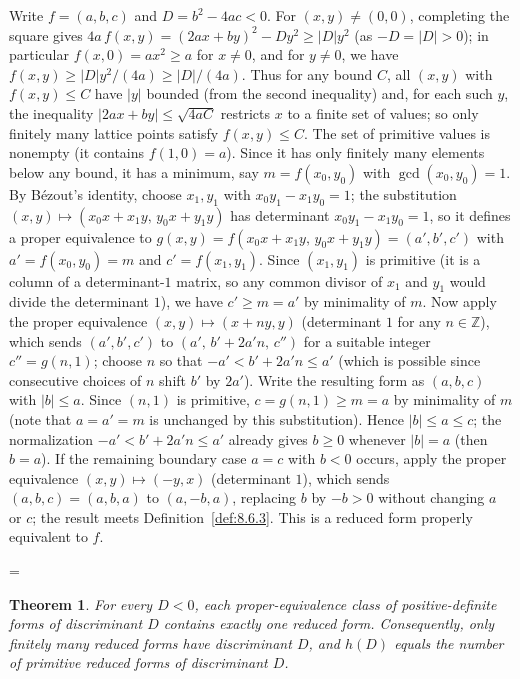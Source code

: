 \documentclass[11pt]{article}
\makeatletter
\theoremstyle{ntstyle}
\newtheorem{theorem}{Theorem}[subsection]
\let\nt@closedisplay\]
\def\nt@guardedclose{\@ifnextchar\par{\nt@closeafterpar}{\@ifnextchar\end{\postdisplaypenalty\@M\nt@closedisplay}{\nt@closedisplay}}}
\def\nt@closeafterpar\par{\@ifnextchar\par{\nt@closeafterpar}{\@ifnextchar\end{\postdisplaypenalty\@M\nt@closedisplay\par}{\nt@closedisplay\par}}}
\renewenvironment{proof}[1][\proofname]{\par
  \pushQED{\qed}\normalfont\topsep\medskipamount\edef\nt@afterproof{\@endparpenalty=\the\@endparpenalty\relax}\@beginparpenalty\@M\@endparpenalty\@M\let\]\nt@guardedclose\trivlist\item[]\textit{#1\@addpunct{.}} \ignorespaces}{\ifvmode\addpenalty\@M\fi\popQED\nt@afterproof\endtrivlist\@endpefalse}
\makeatother
\begin{document}
\begin{proof} Write $f=(a,b,c)$ and $D=b^2-4ac<0$. For
	$(x,y)\neq(0,0)$, completing the square gives
	$4a\,f(x,y)=(2ax+by)^2-Dy^2\ge|D|y^2$ (as $-D=|D|>0$); in particular
	$f(x,0)=ax^2\ge a$ for $x\neq0$, and for $y\neq0$,
	we have $f(x,y)\ge|D|y^2/(4a)\ge|D|/(4a)$. Thus for any bound $C$, all
	$(x,y)$ with $f(x,y)\le C$ have $|y|$ bounded (from the second
	inequality) and, for each such $y$, the inequality $|2ax+by|\le\sqrt{4aC}$ restricts
	$x$ to a finite set of values; so only finitely many lattice points
	satisfy $f(x,y)\le C$. The set of primitive values is nonempty (it contains $f(1,0)=a$). Since it has only finitely many elements below any bound, it has a minimum, say $m=f(x_0,y_0)$ with
	$\gcd(x_0, y_0)=1$. By B{\'e}zout's identity, choose $x_1,y_1$ with $x_0y_1-x_1y_0=1$;
	the substitution $(x,y)\mapsto(x_0x+x_1y,\,y_0x+y_1y)$ has
	determinant $x_0y_1-x_1y_0=1$, so it defines a proper equivalence to
	$g(x,y)=f(x_0x+x_1y,\,y_0x+y_1y)=(a',b',c')$ with $a'=f(x_0,y_0)=m$
	and $c'=f(x_1,y_1)$. Since $(x_1,y_1)$ is primitive (it is a column of a
	determinant-$1$ matrix, so any common divisor of $x_1$ and $y_1$ would
	divide the determinant $1$), we have $c'\ge m=a'$ by minimality of $m$. Now apply the
	proper equivalence $(x,y)\mapsto(x+ny,y)$ (determinant $1$ for any
	$n\in\mathbb{Z}$), which sends $(a',b',c')$ to $(a',\,b'+2a'n,\,c'')$
	for a suitable integer $c''=g(n,1)$; choose $n$ so that
	$-a'<b'+2a'n\le a'$ (which is possible since consecutive choices of $n$ shift
	$b'$ by $2a'$). Write the resulting form as $(a,b,c)$ with $|b|\le
		a$. Since $(n,1)$ is primitive, $c=g(n,1)\ge m=a$ by minimality of
	$m$ (note that $a=a'=m$ is unchanged by this substitution). Hence $|b|\le
		a\le c$; the normalization $-a'<b'+2a'n\le a'$ already gives $b\ge0$ whenever $|b|=a$ (then
	$b=a$). If the remaining boundary case $a=c$ with $b<0$ occurs, apply the proper equivalence
	$(x,y)\mapsto(-y,x)$ (determinant $1$), which sends $(a,b,c)=(a,b,a)$ to $(a,-b,a)$, replacing
	$b$ by $-b>0$ without changing $a$ or $c$; the result meets Definition~\ref{def:8.6.3}. This is a reduced
	form properly equivalent to $f$.

\end{proof}
\begin{theorem}\label{thm:8.6.3}
	For every $D<0$, each proper-equivalence class of positive-definite forms of discriminant $D$ contains exactly one reduced form. Consequently, only finitely many reduced forms have discriminant $D$, and $h(D)$ equals the number of primitive reduced forms of discriminant $D$.

\end{theorem}
\end{document}
